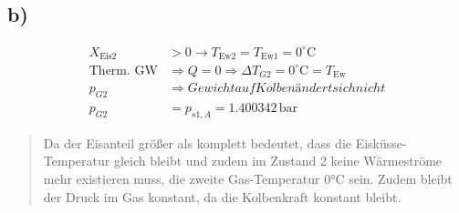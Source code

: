

\subsection*{b)}
\begin{align*}
X_{\text{Eis2}} &> 0 \rightarrow T_{\text{Ew2}} = T_{\text{Ew1}} = 0^\circ \text{C} \\
\text{Therm. GW} &\Rightarrow Q = 0 \Rightarrow \Delta T_{G2} = 0^\circ \text{C} = T_{\text{Ew}} \\
p_{G2} &\Rightarrow Gewicht auf Kolben ändert sich nicht \\
p_{G2} &= p_{s1, A} = 1.400342 \, \text{bar}
\end{align*}

\begin{quote}
Da der Eisanteil größer als komplett bedeutet, dass die Eisküsse-Temperatur gleich bleibt und zudem im Zustand 2 keine Wärmeströme mehr existieren muss, die zweite Gas-Temperatur 0°C sein. Zudem bleibt der Druck im Gas konstant, da die Kolbenkraft konstant bleibt.
\end{quote}
